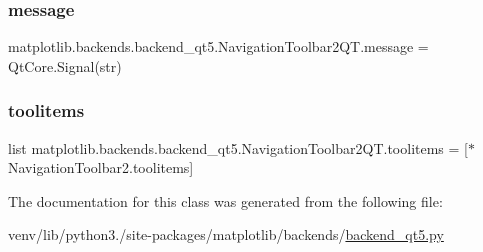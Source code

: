 \subsubsection{\texorpdfstring{message}{message}}
{\footnotesize\ttfamily matplotlib.\+backends.\+backend\+\_\+qt5.\+Navigation\+Toolbar2\+Q\+T.\+message = Qt\+Core.\+Signal(str)\hspace{0.3cm}{\ttfamily [static]}}

\mbox{\label{classmatplotlib_1_1backends_1_1backend__qt5_1_1NavigationToolbar2QT_a8317df9fc783ed11ea09fe78dd1ffd56}} 
\subsubsection{\texorpdfstring{toolitems}{toolitems}}
{\footnotesize\ttfamily list matplotlib.\+backends.\+backend\+\_\+qt5.\+Navigation\+Toolbar2\+Q\+T.\+toolitems = \mbox{[}$\ast$Navigation\+Toolbar2.\+toolitems\mbox{]}\hspace{0.3cm}{\ttfamily [static]}}



The documentation for this class was generated from the following file\+:\begin{DoxyCompactItemize}
\item 
venv/lib/python3./site-\/packages/matplotlib/backends/\hyperlink{backend__qt5_8py}{backend\+\_\+qt5.\+py}\end{DoxyCompactItemize}
